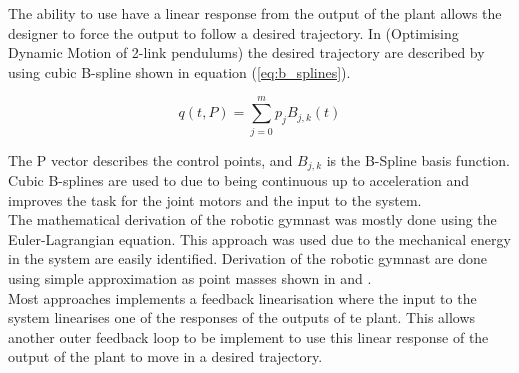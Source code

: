 The ability to use have a linear response from the output of the plant allows the designer to force the output to follow a desired trajectory. In (Optimising Dynamic Motion of 2-link pendulums) the desired trajectory are described by using cubic B-spline shown in equation (\ref{eq:b_splines}).

\begin{equation}
\label{eq:b_splines}
	q(t,P)  = \sum_{j=0}^{m}p_{j}B_{j,k}(t)
\end{equation}

The P vector describes the control points, and $B_{j,k}$ is the B-Spline basis function. Cubic B-splines are used to due to being continuous up to acceleration and improves the task for the joint motors and the input to the system.\\


The mathematical derivation of the robotic gymnast was mostly done using the Euler-Lagrangian equation. This approach was used due to the  mechanical energy in the system are easily identified. Derivation of the robotic gymnast are done using simple approximation as point masses shown in \citep{derivation_controlPlaner} and \citep{tedrake}. \\

Most approaches implements a feedback linearisation where the input to the system linearises one of the responses of the outputs of te plant. This allows another outer feedback loop to be implement to use this linear response of the output of the plant to move in a desired trajectory.\\


